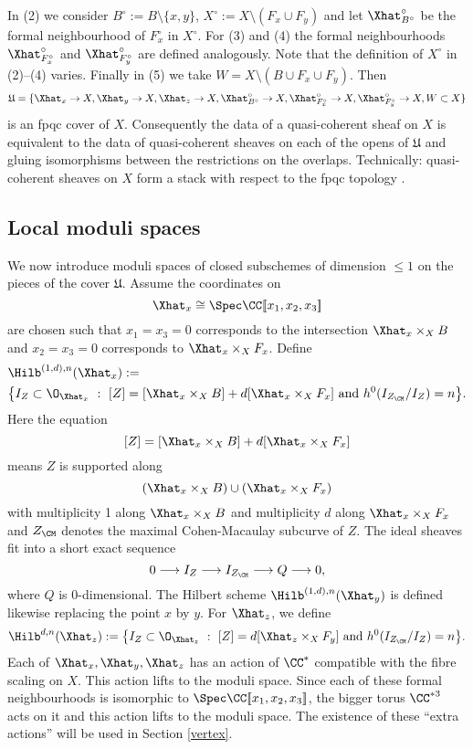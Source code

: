 In (2) we consider $B^\circ := B \setminus \{x,y\}$, $X^\circ := X
\setminus (F_x \cup F_y)$ and let $\Xhat ^{\circ}_{B^\circ}$ be the
formal neighbourhood of $F_{x}^{\circ}$ in $X^\circ$. For (3) and (4)
the formal neighbourhoods $\Xhat ^{\circ}_{F_{x}^{\circ}}$ and $\Xhat
^{\circ}_{F_{y}^{\circ}}$ are defined analogously. Note that the
definition of $X^\circ$ in (2)--(4) varies. Finally in (5) we take $W
= X \setminus (B \cup F_x \cup F_y)$. Then
$$
\mathfrak{U} = \{\Xhat _x \rightarrow X, \Xhat _y \rightarrow X, \Xhat _z \rightarrow X, \Xhat ^{\circ}_{B^\circ} \rightarrow X, \Xhat ^{\circ}_{F_{x}^{\circ}} \rightarrow X, \Xhat ^{\circ}_{F_{y}^{\circ}} \rightarrow X, W \subset X\}
$$
is an fpqc cover of $X$. Consequently the data of a quasi-coherent
sheaf on $X$ is equivalent to the data of quasi-coherent sheaves on
each of the opens of $\mathfrak{U}$ and gluing isomorphisms between
the restrictions on the overlaps. Technically: quasi-coherent sheaves
on $X$ form a stack with respect to the fpqc topology \cite[Vistoli,
Thm.~4.23]{Fundamental-algebraic-geometry}.


\subsection{Local moduli spaces} \label{localmod}

We now introduce moduli spaces of closed subschemes of dimension $\leq 1$ on the pieces of the cover $\mathfrak{U}$. Assume the coordinates on $$\Xhat _x \cong \Spec \CC[\![ x_1,x_2,x_3]\!]$$ are chosen such that $x_1=x_3=0$ corresponds to the intersection $\Xhat _x \times_X B$ and $x_2=x_3=0$ corresponds to $\Xhat _x \times_X F_x$. Define
\begin{align*}
&\Hilb^{(1,d),n}(\Xhat _x) := \\
&\big\{ I_Z \subset \O_{\Xhat _x} \ : \ [Z] = [\Xhat _x \times_X B] + d [\Xhat _x \times_X F_x] \ {\rm{and}} \ h^0(I_{Z_{\CM}} / I_Z) = n \big\}.
\end{align*}
Here the equation
$$
[Z] = [\Xhat _x \times_X B] + d [\Xhat _x \times_X F_x]
$$
means $Z$ is supported along $$(\Xhat _x \times_X B) \cup (\Xhat _x \times_X F_x)$$ with multiplicity 1 along $\Xhat _x \times_X B$ and multiplicity $d$ along $\Xhat _x \times_X F_x$ and $Z_{\CM}$ denotes the maximal Cohen-Macaulay subcurve of $Z$. The ideal sheaves fit into a short exact sequence
$$
0 \longrightarrow I_{Z} \longrightarrow I_{Z_{\CM}} \longrightarrow Q \longrightarrow 0, 
$$
where $Q$ is 0-dimensional. The Hilbert scheme $\Hilb^{(1,d),n}(\Xhat _y)$ is defined likewise replacing the point $x$ by $y$. For $\Xhat _z$, we define
$$
\Hilb^{d,n}(\Xhat _z) := \big\{ I_Z \subset \O_{\Xhat _z} \ : \ [Z] = d [\Xhat _z \times_X F_y] \ {\rm{and}} \ h^0(I_{Z_{\CM}} / I_Z) = n \big\}.
$$
Each of $\Xhat _x, \Xhat _y, \Xhat _z$ has an action of $\CC^*$ compatible with the fibre scaling on $X$. This action lifts to the moduli space. Since each of these formal neighbourhoods is isomorphic to $\Spec \CC[\![x_1,x_2,x_3]\!]$, the bigger torus $\CC^{*3}$ acts on it and this action lifts to the moduli space. The existence of these ``extra actions'' will be used in Section \ref{vertex}.

